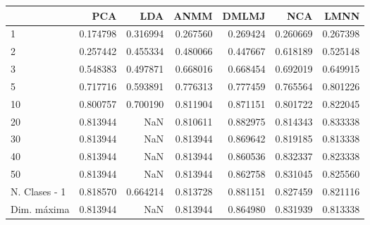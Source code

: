 \begin{tabular}{lrrrrrr}
\toprule
{} &       PCA &       LDA &      ANMM &     DMLMJ &       NCA &      LMNN \\
\midrule
1             &  0.174798 &  0.316994 &  0.267560 &  0.269424 &  0.260669 &  0.267398 \\
2             &  0.257442 &  0.455334 &  0.480066 &  0.447667 &  0.618189 &  0.525148 \\
3             &  0.548383 &  0.497871 &  0.668016 &  0.668454 &  0.692019 &  0.649915 \\
5             &  0.717716 &  0.593891 &  0.776313 &  0.777459 &  0.765564 &  0.801226 \\
10            &  0.800757 &  0.700190 &  0.811904 &  0.871151 &  0.801722 &  0.822045 \\
20            &  0.813944 &       NaN &  0.810611 &  0.882975 &  0.814343 &  0.833338 \\
30            &  0.813944 &       NaN &  0.813944 &  0.869642 &  0.819185 &  0.813338 \\
40            &  0.813944 &       NaN &  0.813944 &  0.860536 &  0.832337 &  0.823338 \\
50            &  0.813944 &       NaN &  0.813944 &  0.862758 &  0.831045 &  0.825560 \\
N. Clases - 1 &  0.818570 &  0.664214 &  0.813728 &  0.881151 &  0.827459 &  0.821116 \\
Dim. máxima   &  0.813944 &       NaN &  0.813944 &  0.864980 &  0.831939 &  0.813338 \\
\bottomrule
\end{tabular}
